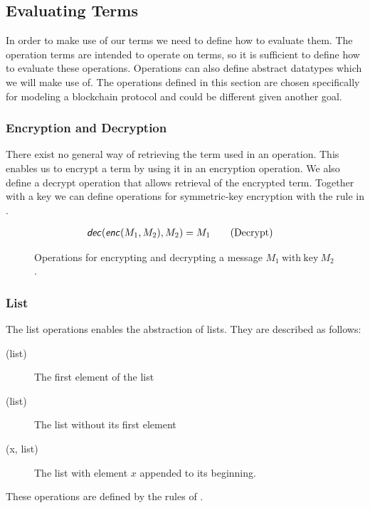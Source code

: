 \subsection{Evaluating Terms}
In order to make use of our terms we need to define how to evaluate them.
The operation terms are intended to operate on terms, so it is sufficient to define how to evaluate these operations.
Operations can also define abstract datatypes which we will make use of.
The operations defined in this section are chosen specifically for modeling a blockchain protocol and could be different given another goal.



\subsubsection{Encryption and Decryption}
There exist no general way of retrieving the term used in an operation.
This enables us to encrypt a term by using it in an encryption operation.
We also define a decrypt operation that allows retrieval of the encrypted term.
Together with a key we can define operations for symmetric-key encryption with the rule in .

\begin{figure}[h]
    \begin{align*}
        &\text{\sffamily \textit{dec}\normalfont}(\text{\sffamily \textit{enc}\normalfont}(M_1, M_2),M_2) = M_1 \tag{Decrypt}
    \end{align*}
    \caption{Operations for encrypting and decrypting a message $M_1\ \mathrm{with\ key}\ M_2$.}
    \label{decryptrule}
\end{figure}
\FloatBarrier

\subsubsection{List}
The list operations enables the abstraction of lists.
They are described as follows:

\begin{description}
	\item[(list)] The first element of the list
	\item[(list)] The list without its first element
	\item[(x, list)] The list with element $x$ appended to its beginning.
\end{description}

These operations are defined by the rules of .

